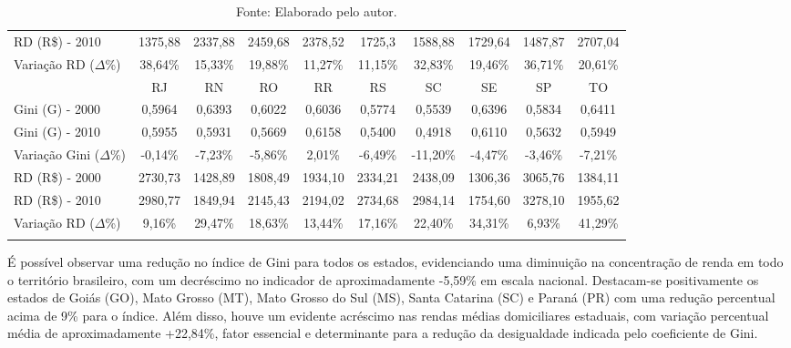 \begin{table}[!h]
{\begin{tabular}{lccccccccc}
    RD (R\$) - 2010 & 1375,88 & 2337,88 & 2459,68 & 2378,52 & 1725,3 & 1588,88 & 1729,64 & 1487,87 & 2707,04 \\
    Variação RD ($\Delta$\%) & {\color[HTML]{00009B} 38,64\%} & {\color[HTML]{00009B} 15,33\%} & {\color[HTML]{00009B} 19,88\%} & {\color[HTML]{00009B} 11,27\%} & {\color[HTML]{00009B} 11,15\%} & {\color[HTML]{00009B} 32,83\%} & {\color[HTML]{00009B} 19,46\%} & {\color[HTML]{00009B} 36,71\%} & {\color[HTML]{00009B} 20,61\%} \\ \Xhline{2pt}
     & RJ & RN & RO & RR & RS & SC & SE & SP & TO \\ \cline{2-10} 
    Gini (G) - 2000 & 0,5964 & 0,6393 & 0,6022 & 0,6036 & 0,5774 & 0,5539 & 0,6396 & 0,5834 & 0,6411 \\
    Gini (G) - 2010 & 0,5955 & 0,5931 & 0,5669 & 0,6158 & 0,5400 & 0,4918 & 0,6110 & 0,5632 & 0,5949 \\
    Variação Gini ($\Delta$\%) & {\color[HTML]{FE0000} -0,14\%} & {\color[HTML]{FE0000} -7,23\%} & {\color[HTML]{FE0000} -5,86\%} & {\color[HTML]{FE0000} 2,01\%} & {\color[HTML]{FE0000} -6,49\%} & {\color[HTML]{FE0000} -11,20\%} & {\color[HTML]{FE0000} -4,47\%} & {\color[HTML]{FE0000} -3,46\%} & {\color[HTML]{FE0000} -7,21\%} \\
    RD (R\$) - 2000 & 2730,73 & 1428,89 & 1808,49 & 1934,10 & 2334,21 & 2438,09 & 1306,36 & 3065,76 & 1384,11 \\
    RD (R\$) - 2010 & 2980,77 & 1849,94 & 2145,43 & 2194,02 & 2734,68 & 2984,14 & 1754,60 & 3278,10 & 1955,62 \\
    Variação RD ($\Delta$\%) & {\color[HTML]{00009B} 9,16\%} & {\color[HTML]{00009B} 29,47\%} & {\color[HTML]{00009B} 18,63\%} & {\color[HTML]{00009B} 13,44\%} & {\color[HTML]{00009B} 17,16\%} & {\color[HTML]{00009B} 22,40\%} & {\color[HTML]{00009B} 34,31\%} & {\color[HTML]{00009B} 6,93\%} & {\color[HTML]{00009B} 41,29\%} \\ \Xhline{2pt}
    \end{tabular}}
    \label{tab:cap04:giniestados}
    \caption*{\footnotesize{Fonte: Elaborado pelo autor.}}
\end{table}

É possível observar uma redução no índice de Gini para todos os estados, evidenciando uma diminuição na concentração de renda em todo o território brasileiro, com um decréscimo no indicador de aproximadamente -5,59\% em escala nacional. Destacam-se positivamente os estados de Goiás (GO), Mato Grosso (MT), Mato Grosso do Sul (MS), Santa Catarina (SC) e Paraná (PR) com uma redução percentual acima de 9\% para o índice. Além disso, houve um evidente acréscimo nas rendas médias domiciliares estaduais, com variação percentual média de aproximadamente +22,84\%, fator essencial e determinante para a redução da desigualdade indicada pelo coeficiente de Gini.

